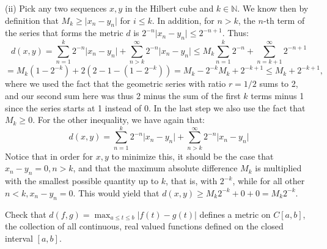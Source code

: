 \begin{solution}
    (ii) Pick any two sequences $x, y$ in the Hilbert cube and $k \in \mathbb{N}$.
    We know then by definition that $M_k \geq \lvert x_n - y_n \rvert$ for $i \leq k$.
    In addition, for $n > k$, the $n$-th term of the series that forms the metric $d$ is $2^{-n}\lvert x_n - y_n \rvert \leq 2^{-n+1}$.
    Thus:
    $$d(x, y) = \sum_{n=1}^{k} 2^{-n} \lvert x_n - y_n \rvert + \sum_{n > k}^{\infty}2^{-n}\lvert x_n - y_n \rvert \leq M_k \sum_{n=1}^{k}2^{-n} + \sum_{n=k+1}^{\infty} 2^{-n + 1}$$
    $$ = M_k(1 - 2^{-k}) + 2(2 - 1 - (1 - 2^{-k})) = M_k - 2^{-k}M_k + 2^{-k+1} \leq M_k + 2^{-k+1},$$
    where we used the fact that the geometric series with ratio $r=1/2$ sums to 2, and our second sum here was thus 2 minus the sum of the first $k$ terms minus 1 since the series starts at 1 instead of 0.
    In the last step we also use the fact that $M_k \geq 0$.
    For the other inequality, we have again that:
    $$d(x, y) = \sum_{n=1}^{k} 2^{-n} \lvert x_n - y_n \rvert + \sum_{n > k}^{\infty}2^{-n}\lvert x_n - y_n \rvert$$
    Notice that in order for $x, y$ to minimize this, it should be the case that $x_n - y_n = 0, n > k$, and that the maximum absolute difference $M_k$ is multiplied with the smallest possible quantity up to $k$, that is, with $2^{-k}$, while for all other $n < k, x_n - y_n = 0$.
    This would yield that $d(x, y) \geq M_k2^{-k} + 0 + 0 = M_k2^{-k}$.

\end{solution}

\begin{exercise}{12}
    Check that $d(f, g) = \max_{a \leq t \leq b} \lvert f(t) - g(t) \rvert$ defines a metric on $C[a, b]$, the collection of all continuous, real valued functions defined on the closed interval $[a, b]$.
\end{exercise}


